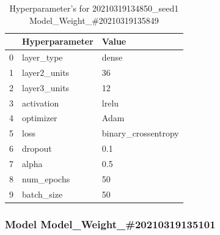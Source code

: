 \begin{table}
\centering
\caption{Hyperparameter's for 20210319134850\_seed1 Model\_Weight\_\#20210319135849}
\label{tab:hyp20210319134850seed1ModelWeight20210319135849}
\begin{tabular}{lll}
\toprule
{} & Hyperparameter &                Value \\
\midrule
0 &     layer\_type &                dense \\
1 &   layer2\_units &                   36 \\
2 &   layer3\_units &                   12 \\
3 &     activation &                lrelu \\
4 &      optimizer &                 Adam \\
5 &           loss &  binary\_crossentropy \\
6 &        dropout &                  0.1 \\
7 &          alpha &                  0.5 \\
8 &     num\_epochs &                   50 \\
9 &     batch\_size &                   50 \\
\bottomrule
\end{tabular}
\end{table}
\subsubsection{Model Model\_Weight\_\#20210319135101}

